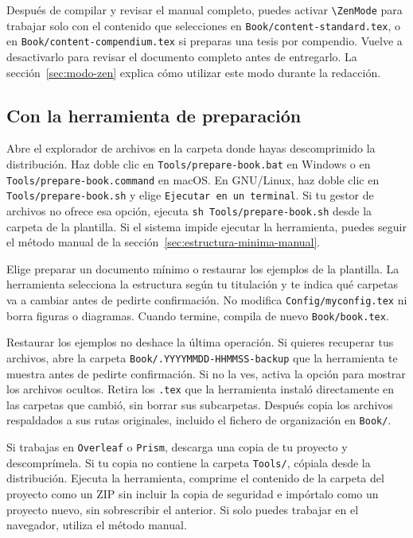 Después de compilar y revisar el manual completo, puedes activar \texttt{\textbackslash{}ZenMode} para trabajar solo con el contenido que selecciones en \texttt{Book/content-standard.tex}, o en \texttt{Book/content-compendium.tex} si preparas una tesis por compendio. Vuelve a desactivarlo para revisar el documento completo antes de entregarlo. La sección~\ref{sec:modo-zen} explica cómo utilizar este modo durante la redacción.

\subsection{Con la herramienta de preparación}

Abre el explorador de archivos en la carpeta donde hayas descomprimido la distribución. Haz doble clic en \texttt{Tools/prepare-book.bat} en Windows o en \texttt{Tools/prepare-book.command} en macOS. En GNU/Linux, haz doble clic en \texttt{Tools/prepare-book.sh} y elige \texttt{Ejecutar en un terminal}. Si tu gestor de archivos no ofrece esa opción, ejecuta \verb|sh Tools/prepare-book.sh| desde la carpeta de la plantilla. Si el sistema impide ejecutar la herramienta, puedes seguir el método manual de la sección~\ref{sec:estructura-minima-manual}.

Elige preparar un documento mínimo o restaurar los ejemplos de la plantilla. La herramienta selecciona la estructura según tu titulación y te indica qué carpetas va a cambiar antes de pedirte confirmación. No modifica \texttt{Config/myconfig.tex} ni borra figuras o diagramas. Cuando termine, compila de nuevo \texttt{Book/book.tex}.

Restaurar los ejemplos no deshace la última operación. Si quieres recuperar tus archivos, abre la carpeta \texttt{Book/.YYYYMMDD-HHMMSS-backup} que la herramienta te muestra antes de pedirte confirmación. Si no la ves, activa la opción para mostrar los archivos ocultos. Retira los \texttt{.tex} que la herramienta instaló directamente en las carpetas que cambió, sin borrar sus subcarpetas. Después copia los archivos respaldados a sus rutas originales, incluido el fichero de organización en \texttt{Book/}.

Si trabajas en \texttt{Overleaf} o \texttt{Prism}, descarga una copia de tu proyecto y descomprímela. Si tu copia no contiene la carpeta \texttt{Tools/}, cópiala desde la distribución. Ejecuta la herramienta, comprime el contenido de la carpeta del proyecto como un ZIP sin incluir la copia de seguridad e impórtalo como un proyecto nuevo, sin sobrescribir el anterior. Si solo puedes trabajar en el navegador, utiliza el método manual.

